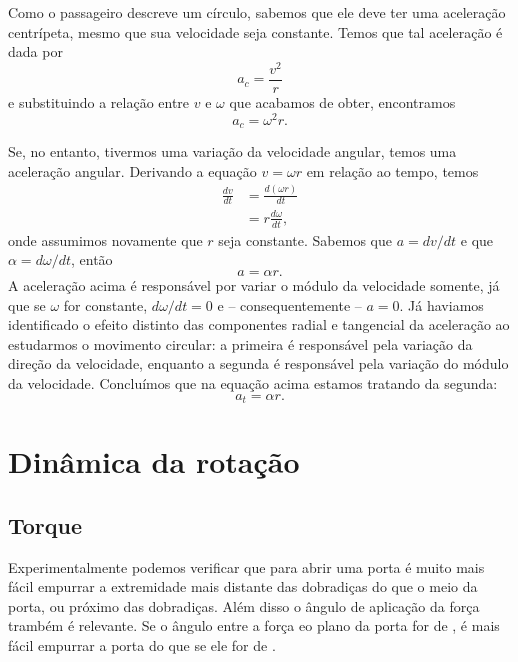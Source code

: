 Como o passageiro descreve um círculo, sabemos que ele deve ter uma aceleração centrípeta, mesmo que sua velocidade seja constante. Temos que tal aceleração é dada por
\begin{equation}
	a_c = \frac{v^2}{r}
\end{equation}
%
e substituindo a relação entre $v$ e $\omega$ que acabamos de obter, encontramos
\begin{equation}
	a_c = \omega^2 r.
\end{equation}

Se, no entanto, tivermos uma variação da velocidade angular, temos uma aceleração angular. Derivando a equação $v = \omega r$ em relação ao tempo, temos
\begin{align}
	\frac{dv}{dt} &= \frac{d(\omega r)}{dt} \\
	&=r \frac{d\omega}{dt},
\end{align}
%
onde assumimos novamente que $r$ seja constante. Sabemos que $a=dv/dt$ e que $\alpha = d\omega/dt$, então
\begin{equation}
	a = \alpha r.
\end{equation}
%
A aceleração acima é responsável por variar o módulo da velocidade somente, já que se $\omega$ for constante, $d\omega/dt = 0$ e -- consequentemente -- $a=0$. Já haviamos identificado o efeito distinto das componentes radial e tangencial da aceleração ao estudarmos o movimento circular: a primeira é responsável pela variação da direção da velocidade, enquanto a segunda é responsável pela variação do módulo da velocidade. Concluímos que na equação acima estamos tratando da segunda:
\begin{equation}
	a_t = \alpha r.
\end{equation}

\section{Dinâmica da rotação}

\subsection{Torque}

Experimentalmente podemos verificar que para abrir uma porta é muito mais fácil empurrar a extremidade mais distante das dobradiças do que o meio da porta, ou próximo das dobradiças. Além disso o ângulo de aplicação da força trambém é relevante. Se o ângulo entre a força eo plano da porta for de , é mais fácil empurrar a porta do que se ele for de .

